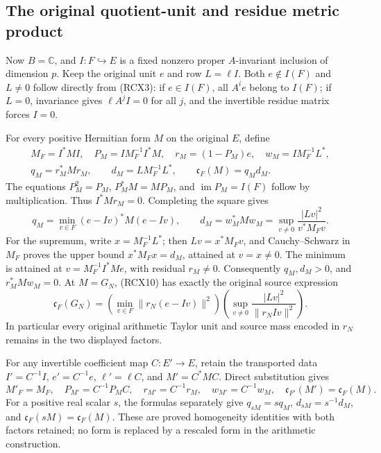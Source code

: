 \documentclass{article}
\begin{document}
\subsection{The original quotient-unit and residue metric product}

Now \(B=\mathbb C\), and \(I:F\hookrightarrow E\) is a fixed
nonzero proper \(A\)-invariant inclusion of dimension \(p\). Keep the
original unit \(e\) and row \(L=\ell I\). Both \(e\notin I(F)\)
and \(L\ne0\) follow directly from (RCX3): if \(e\in I(F)\), all
\(A^ie\) belong to \(I(F)\); if \(L=0\), invariance gives
\(\ell A^j I=0\) for all \(j\), and the invertible residue matrix
forces \(I=0\).

For every positive Hermitian form \(M\) on the original \(E\), define
\[
\begin{gathered}
 M_F=I^*MI,\quad P_M=I M_F^{-1}I^*M,\quad
 r_M=(1-P_M)e,\quad w_M=I M_F^{-1}L^*,\\
 q_M=r_M^*Mr_M,\qquad d_M=L M_F^{-1}L^*,\qquad
 \mathfrak c_F(M)=q_Md_M .
\end{gathered}\tag{RCX9}
\]
The equations \(P_M^2=P_M\), \(P_M^*M=MP_M\), and
\(\operatorname{im}P_M=I(F)\) follow by multiplication.
Thus \(I^*Mr_M=0\). Completing the square gives
\[
 q_M=\min_{v\in F}(e-Iv)^*M(e-Iv),\qquad
 d_M=w_M^*Mw_M
     =\sup_{v\ne0}\frac{|Lv|^2}{v^*M_Fv}.
 \tag{RCX10}
\]
For the supremum, write \(x=M_F^{-1}L^*\); then
\(Lv=x^*M_Fv\), and Cauchy--Schwarz in \(M_F\) proves the upper
bound \(x^*M_Fx=d_M\), attained at \(v=x\ne0\).
The minimum is attained at \(v=M_F^{-1}I^*Me\), with residual
\(r_M\ne0\). Consequently \(q_M,d_M>0\), and
\(r_M^*Mw_M=0\).
At \(M=G_N\), (RCX10) has exactly the original source expression
\[
 \mathfrak c_F(G_N)=
 \left(\min_{v\in F}\|r_N(e-Iv)\|^2\right)
 \left(\sup_{v\ne0}\frac{|Lv|^2}{\|r_NIv\|^2}\right).
 \tag{RCX11}
\]
In particular every original arithmetic Taylor unit and source mass
encoded in \(r_N\) remains in the two displayed factors.

For any invertible coefficient map \(C:E'\to E\), retain the transported
data \(I'=C^{-1}I\), \(e'=C^{-1}e\),
\(\ell'=\ell C\), and \(M'=C^*MC\). Direct substitution gives
\[
 M'_F=M_F,\quad P_{M'}=C^{-1}P_MC,\quad
 r_{M'}=C^{-1}r_M,\quad w_{M'}=C^{-1}w_M,\quad
 \mathfrak c_{F'}(M')=\mathfrak c_F(M).
 \tag{RCX12}
\]
For a positive real scalar \(s\), the formulas separately give
\(q_{sM}=s q_M\), \(d_{sM}=s^{-1}d_M\), and
\(\mathfrak c_F(sM)=\mathfrak c_F(M)\). These are proved
homogeneity identities with both factors retained; no form is replaced
by a rescaled form in the arithmetic construction.
\end{document}
